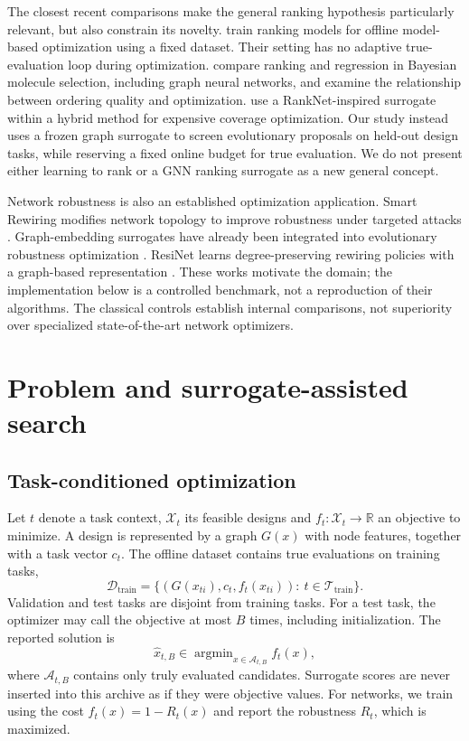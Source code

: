 \documentclass[11pt,a4paper]{article}
\newcommand{\R}{\mathbb{R}}
\begin{document}
The closest recent comparisons make the general ranking hypothesis particularly relevant, but also constrain its novelty. \citet{tan2025} train ranking models for offline model-based optimization using a fixed dataset. Their setting has no adaptive true-evaluation loop during optimization. \citet{tom2025} compare ranking and regression in Bayesian molecule selection, including graph neural networks, and examine the relationship between ordering quality and optimization. \citet{wu2025} use a RankNet-inspired surrogate within a hybrid method for expensive coverage optimization. Our study instead uses a frozen graph surrogate to screen evolutionary proposals on held-out design tasks, while reserving a fixed online budget for true evaluation. We do not present either learning to rank or a GNN ranking surrogate as a new general concept.

Network robustness is also an established optimization application. Smart Rewiring modifies network topology to improve robustness under targeted attacks \citep{louzada2013}. Graph-embedding surrogates have already been integrated into evolutionary robustness optimization \citep{wang2019}. ResiNet learns degree-preserving rewiring policies with a graph-based representation \citep{yang2023}. These works motivate the domain; the implementation below is a controlled benchmark, not a reproduction of their algorithms. The classical controls establish internal comparisons, not superiority over specialized state-of-the-art network optimizers.

\section{Problem and surrogate-assisted search}
\subsection{Task-conditioned optimization}
Let $t$ denote a task context, $\mathcal X_t$ its feasible designs and $f_t:\mathcal X_t\to\R$ an objective to minimize. A design is represented by a graph $G(x)$ with node features, together with a task vector $c_t$. The offline dataset contains true evaluations on training tasks,
\begin{equation}
\mathcal D_{\mathrm{train}}=\{(G(x_{ti}),c_t,f_t(x_{ti})):\ t\in\mathcal T_{\mathrm{train}}\}.
\end{equation}
Validation and test tasks are disjoint from training tasks. For a test task, the optimizer may call the objective at most $B$ times, including initialization. The reported solution is
\begin{equation}
\hat x_{t,B}\in\mathop{\mathrm{argmin}}_{x\in\mathcal A_{t,B}}f_t(x),
\end{equation}
where $\mathcal A_{t,B}$ contains only truly evaluated candidates. Surrogate scores are never inserted into this archive as if they were objective values. For networks, we train using the cost $f_t(x)=1-R_t(x)$ and report the robustness $R_t$, which is maximized.
\end{document}

